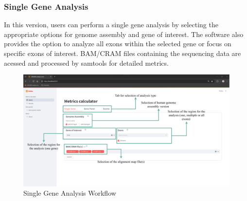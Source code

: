 \subsubsection{\textbf{Single Gene Analysis}}

In this version, users can perform a single gene analysis by selecting the appropriate options for genome assembly and gene of interest. The software also provides the option to analyze all exons within the selected gene or focus on specific exons of interest. BAM/CRAM files containing the sequencing data are acessed and processed by samtools for detailed metrics.

\begin{figure}[H]
    \centering
    \includegraphics[width=\textwidth]{figs/v3.2.png}
    \caption{Single Gene Analysis Workflow}
    \label{fig:single_gene}
\end{figure}

